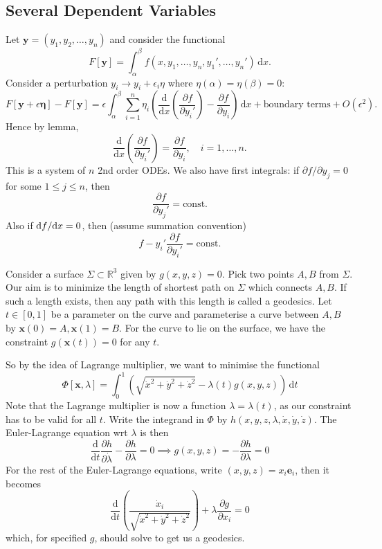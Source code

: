 \documentclass[a4paper]{article}
\begin{document}
\subsection{Several Dependent Variables}
Let $ \mathbf{y}=(y_1,y_2,\dots,y_n) $ and consider the functional 
\[
    F[\mathbf{y}] = \int_{\alpha}^{\beta} f(x,y_1,\dots,y_n, y_1',\dots,y_n') \,\mathrm{d}x.
\]
Consider a perturbation $ y_i \to y_i + \epsilon_i \eta $ where $ \eta(\alpha)=\eta(\beta)=0 $:
\[
    F[\mathbf{y}+\epsilon \boldsymbol{\eta}] - F[\mathbf{y}] = \epsilon\int_{\alpha}^{\beta} \sum_{i=1}^{n} \eta_i\left( \frac{\mathrm{d}}{\mathrm{d}x}\left( \frac{\partial f}{\partial y_i'}  \right) -\frac{\partial f}{\partial y_i} \right)  \,\mathrm{d}x + \text{boundary terms} + O(\epsilon^2).
\]
Hence by lemma, 
\[
    \frac{\mathrm{d}}{\mathrm{d}x}\left( \frac{\partial f}{\partial y_i'}  \right) = \frac{\partial f}{\partial y_i},\quad i=1,\dots,n.  
\]
This is a system of $n$ 2nd order ODEs. We also have first integrals: if $ \partial f/\partial y_j=0  $ for some $ 1\le j\le n $, then 
\[
    \frac{\partial f}{\partial y_j'}=\text{const}. 
\]
Also if $ \mathrm{d} f / \mathrm{d} x = 0 $, then (assume summation convention)
\[
    f - y_i' \frac{\partial f}{\partial y_i'}= \text{const}. 
\]
\begin{example}
    Consider a surface $\Sigma\subset\mathbb R^3$ given by $g(x,y,z)=0$.
    Pick two points $A,B$ from $\Sigma$.
    Our aim is to minimize the length of shortest path on $\Sigma$ which connects $A,B$.
    If such a length exists, then any path with this length is called a geodesics.
    Let $t\in[0,1]$ be a parameter on the curve and parameterise a curve between $A,B$ by $\mathbf{x}(0)=A,\mathbf{x}(1)=B$.
    For the curve to lie on the surface, we have the constraint $g(\mathbf{x}(t))=0$ for any $t$.

    So by the idea of Lagrange multiplier, we want to minimise the functional
    $$\Phi[\mathbf{x},\lambda]=\int_0^1\left( \sqrt{\dot{x}^2+\dot{y}^2+\dot{z}^2} -\lambda(t) g(x,y,z)\right)\,\mathrm dt$$
    Note that the Lagrange multiplier is now a function $\lambda=\lambda(t)$, as our constraint has to be valid for all $t$.
    Write the integrand in $\Phi$ by $h(x,y,z,\lambda,\dot{x},\dot{y},\dot{z})$.
    The Euler-Lagrange equation wrt $\lambda$ is then
    $$\frac{\mathrm d}{\mathrm dt}\frac{\partial h}{\partial \dot{\lambda}}-\frac{\partial h}{\partial\lambda}=0\implies g(x,y,z)=-\frac{\partial h}{\partial\lambda}=0$$
    For the rest of the Euler-Lagrange equations, write $(x,y,z)=x_i\mathbf{e}_i$, then it becomes
    $$\frac{\mathrm d}{\mathrm dt}\left( \frac{\dot{x}_i}{\sqrt{\dot{x}^2+\dot{y}^2+\dot{z}^2}} \right)+\lambda\frac{\partial g}{\partial x_i}=0$$
    which, for specified $g$, should solve to get us a geodesics.
\end{example}
\end{document}
